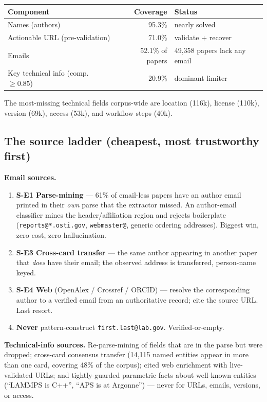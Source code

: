\documentclass[11pt,letterpaper]{article}
\newcommand{\code}[1]{\texttt{\small #1}}
\begin{document}
\begin{center}
\small
\begin{tabular}{@{}l r l@{}}
\toprule
\textbf{Component} & \textbf{Coverage} & \textbf{Status} \\
\midrule
Names (authors)                 & 95.3\% & nearly solved \\
Actionable URL (pre-validation) & 71.0\% & validate + recover \\
Emails                          & 52.1\% of papers & 49{,}358 papers lack any email \\
Key technical info (comp.\ $\geq 0.85$) & 20.9\% & dominant limiter \\
\bottomrule
\end{tabular}
\end{center}

\noindent The most-missing technical fields corpus-wide are location (116k),
license (110k), version (69k), access (53k), and workflow steps (40k).

\subsection{The source ladder (cheapest, most trustworthy first)}

\textbf{Email sources.}
\begin{enumerate}[noitemsep,topsep=2pt]
\item \textbf{S-E1 Parse-mining} --- 61\% of email-less papers have an author email
  printed in their \emph{own} parse that the extractor missed. An author-email
  classifier mines the header/affiliation region and rejects boilerplate
  (\code{reports@*.osti.gov}, \code{webmaster@}, generic ordering addresses).
  Biggest win, zero cost, zero hallucination.
\item \textbf{S-E3 Cross-card transfer} --- the same author appearing in another
  paper that \emph{does} have their email; the observed address is transferred,
  person-name keyed.
\item \textbf{S-E4 Web} (OpenAlex / Crossref / ORCID) --- resolve the corresponding
  author to a verified email from an authoritative record; cite the source URL.
  Last resort.
\item \textbf{Never} pattern-construct \code{first.last@lab.gov}. Verified-or-empty.
\end{enumerate}

\textbf{Technical-info sources.} Re-parse-mining of fields that are in the parse but
were dropped; cross-card consensus transfer (14{,}115 named entities appear in more
than one card, covering 48\% of the corpus); cited web enrichment with live-validated
URLs; and tightly-guarded parametric facts about well-known entities (``LAMMPS is
C++'', ``APS is at Argonne'') --- never for URLs, emails, versions, or access.
\end{document}
